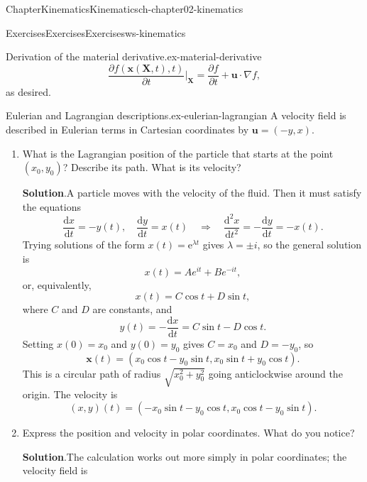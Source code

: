 \documentclass[oneside,10pt,]{book}
\newcommand{\blocktitlefont}{\relax}
\numberwithin{equation}{section}
\newcommand{\e}{\mathrm{e}}
\newcommand{\de}{\mathrm{d}}
\newcommand{\dd}[2]{\frac{\de#1}{\de#2}}
\newcommand{\pd}[2]{\frac{\partial#1}{\partial#2}}
\newcommand{\bx}{\boldsymbol{x}}
\newcommand{\bX}{\boldsymbol{X}}
\newcommand{\bu}{\boldsymbol{u}}
\begin{document}
\begin{chapterptx}{Chapter}{Kinematics}{}{Kinematics}{}{}{ch-chapter02-kinematics}
\begin{exercises-section}{Exercises}{Exercises}{}{Exercises}{}{}{ws-kinematics}
\begin{divisionexercise}{2}{Derivation of the material derivative.}{}{ex-material-derivative}
\begin{equation*}
\pd{f(\bx(\bX, t), t)}{t}\biggr\rvert_{\bX} = \pd{f}{t} + \bu \cdot \nabla f,
\end{equation*}
as desired.%
\end{divisionexercise}%
\begin{divisionexercise}{3}{Eulerian and Lagrangian descriptions.}{}{ex-eulerian-lagrangian}%
A velocity field is described in Eulerian terms in Cartesian coordinates by \(\mathbf{u}=(-y,x)\).%
\begin{enumerate}[font=\bfseries,label=(\alph*),ref=\alph*]%
\item{}What is the Lagrangian position of the particle that starts at the point \((x_0,y_0)\)? Describe its path. What is its velocity?%
\par\smallskip%
\noindent\textbf{\blocktitlefont Solution}.\hypertarget{ex-eulerian-lagrangian-3-2}{}\quad{}A particle moves with the velocity of the fluid. Then it must satisfy the equations%
\begin{equation*}
\dd{x}{t} = -y(t),\quad \dd{y}{t} = x(t)
\quad\Rightarrow\quad
\dd{^2x}{t^2} = -\dd{y}{t} = -x(t).
\end{equation*}
Trying solutions of the form \(x(t)=\e^{\lambda t}\) gives \(\lambda=\pm i\), so the general solution is%
\begin{equation*}
x(t) = Ae^{it}+Be^{-it},
\end{equation*}
or, equivalently,%
\begin{equation*}
x(t) = C\cos t + D\sin t,
\end{equation*}
where \(C\) and \(D\) are constants, and%
\begin{equation*}
y(t) =-\dd{x}{t}= C\sin t - D\cos t.
\end{equation*}
Setting \(x(0)=x_0\) and \(y(0)=y_0\) gives \(C=x_0\) and \(D=-y_0\), so%
\begin{equation*}
\bx(t) = (x_0\cos t - y_0\sin t, x_0\sin t + y_0\cos t).
\end{equation*}
This is a circular path of radius \(\sqrt{x_0^2+y_0^2}\) going anticlockwise around the origin. The velocity is%
\begin{equation*}
(x,y)(t) = (-x_0\sin t - y_0\cos t, x_0\cos t - y_0\sin t).
\end{equation*}
%
\item{}Express the position and velocity in polar coordinates. What do you notice?%
\par\smallskip%
\noindent\textbf{\blocktitlefont Solution}.\hypertarget{ex-eulerian-lagrangian-4-2}{}\quad{}The calculation works out more simply in polar coordinates; the velocity field is%

\end{enumerate}
\end{divisionexercise}
\end{exercises-section}
\end{chapterptx}
\end{document}

